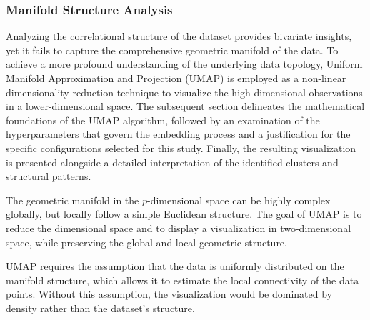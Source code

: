 \subsubsection*{Manifold Structure Analysis}
Analyzing the correlational structure of the dataset provides bivariate insights, yet it fails to capture the comprehensive geometric manifold of the data. 
To achieve a more profound understanding of the underlying data topology, Uniform Manifold Approximation and Projection (UMAP) \citep{mcinnes2018umap} is employed as a non-linear dimensionality reduction technique to visualize the high-dimensional observations in a lower-dimensional space. 
The subsequent section delineates the mathematical foundations of the UMAP algorithm, followed by an examination of the hyperparameters that govern the embedding process and a justification for the specific configurations selected for this study. 
Finally, the resulting visualization is presented alongside a detailed interpretation of the identified clusters and structural patterns.


The geometric manifold in the $p$-dimensional space can be highly complex globally, but locally follow a simple Euclidean structure.
The goal of UMAP is to reduce the dimensional space and to display a visualization in two-dimensional space, while preserving the global and local geometric structure.\citep{mcinnes2018umap}


UMAP requires the assumption that the data is uniformly distributed on the manifold structure, which allows it to estimate the local connectivity of the data points.
Without this assumption, the visualization would be dominated by density rather than the dataset's structure. 


